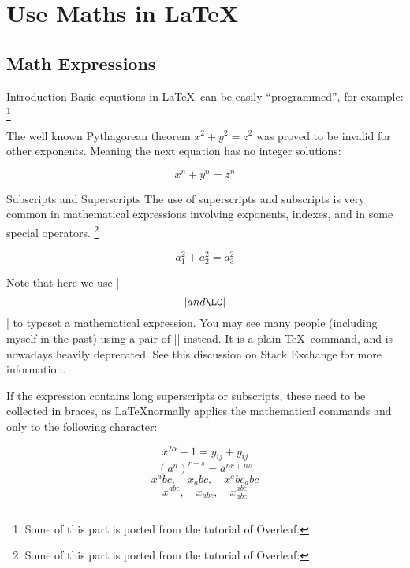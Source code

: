
\section{Use Maths in \LaTeX}

\subsection{Math Expressions}

\begin{frame}[fragile]{Introduction}
Basic equations in \LaTeX\ can be easily ``programmed'', for example: \footnote[1]{Some of this part is ported from the tutorial of Overleaf: }
\begin{latexexample}
The well known Pythagorean theorem \(x^2 + y^2 = z^2\) was 
proved to be invalid for other exponents. 
Meaning the next equation has no integer solutions:

\[ x^n + y^n = z^n \]
\end{latexexample}
\end{frame}

\begin{frame}[fragile]{Subscripts and Superscripts}
The use of superscripts and subscripts is very common in mathematical expressions involving exponents, indexes, and in some special operators. \footnote[1]{Some of this part is ported from the tutorial of Overleaf: }

\begin{latexexample}
\[ a_1^2 + a_2^2 = a_3^2 \]
\end{latexexample}

Note that here we use \LC|\[| and \LC|\]| to typeset a mathematical expression. You may see many people (including myself in the past) using a pair of \LC|$$| instead. It is a plain-\TeX\ command, and is nowadays heavily deprecated. See this discussion  on Stack Exchange for more information. 

\end{frame}

\begin{frame}[fragile]

If the expression contains long superscripts or subscripts, these need to be collected in braces, as \LaTeX normally applies the mathematical commands \LC{^} and \LC{_} only to the following character:

\begin{latexexample}
\[ x^{2 \alpha} - 1 = y_{ij} + y_{ij}  \]
\[ (a^n)^{r+s} = a^{nr+ns}  \]
\[ x^abc, \quad x_abc, \quad x^abc_abc \]
\[ x^{abc}, \quad x_{abc}, \quad x^{abc}_{abc} \]
\end{latexexample}

\end{frame}

